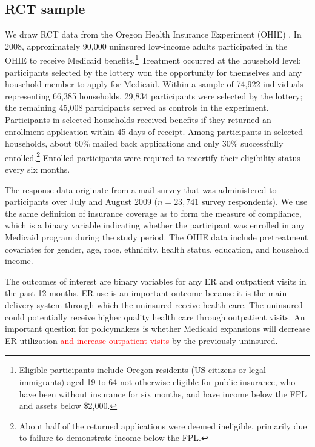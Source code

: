 \documentclass[hidelinks,12pt]{article}
\begin{document}
\subsection{RCT sample} 

We draw RCT data from the Oregon Health Insurance Experiment (OHIE) \citep{finkelstein2012,baicker2013,baicker2014,Taubman}. In 2008, approximately 90,000 uninsured low-income adults participated in the OHIE to receive Medicaid benefits.\footnote{Eligible participants include Oregon residents (US citizens or legal immigrants) aged 19 to 64 not otherwise eligible for public insurance, who have been without insurance for six months, and have income below the FPL and assets below \$2,000.} Treatment occurred at the household level: participants selected by the lottery won the opportunity for themselves and any household member to apply for Medicaid. Within a sample of 74,922 individuals representing 66,385 households, 29,834 participants were selected by the lottery; the remaining 45,008 participants served as controls in the experiment. Participants in selected households received benefits if they returned an enrollment application within 45 days of receipt. Among participants in selected households, about 60\% mailed back applications and only 30\% successfully enrolled.\footnote{About half of the returned applications were deemed ineligible, primarily due to failure to demonstrate income below the FPL.} Enrolled participants were required to recertify their eligibility status every six months.

The response data originate from a mail survey that was administered to participants over July and August 2009 ($n = 23,741$ survey respondents). We use the same definition of insurance coverage as \citet{finkelstein2012} to form the measure of compliance, which is a binary variable indicating whether the participant was enrolled in any Medicaid program during the study period. The OHIE data include pretreatment covariates for gender, age, race, ethnicity, health status, education, and household income.  

The outcomes of interest are binary variables for any ER and outpatient visits in the past 12 months. ER use is an important outcome because it is the main delivery system through which the uninsured receive health care. The uninsured could potentially receive higher quality health care through outpatient visits. An important question for policymakers is whether Medicaid expansions will decrease ER utilization \textcolor{red}{and increase outpatient visits} by the previously uninsured.   	
\end{document}

